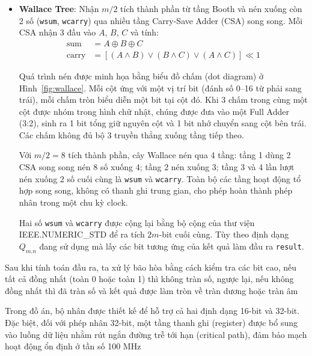 \documentclass{uetgraduation}
\begin{document}
\begin{itemize}
    \item  \textbf{Wallace Tree}: Nhận $m/2$ tích thành phần từ tầng
    Booth và nén xuống còn 2 số (\texttt{wsum}, \texttt{wcarry}) qua
    nhiều tầng Carry-Save Adder (CSA) song song. Mỗi CSA nhận 3 đầu
    vào $A$, $B$, $C$ và tính:
    \begin{equation}
    \begin{aligned}
        \text{sum}   &= A \oplus B \oplus C \\
        \text{carry} &= \left[(A \wedge B) \vee (B \wedge C)
                        \vee (A \wedge C)\right] \ll 1
    \end{aligned}
    \end{equation}

    Quá trình nén được minh họa bằng biểu đồ chấm (dot diagram) ở
    Hình~\ref{fig:wallace}. Mỗi cột ứng với một vị trí bit (đánh số
    0--16 từ phải sang trái), mỗi chấm tròn biểu diễn một bit tại cột
    đó. Khi 3 chấm trong cùng một cột được nhóm trong hình chữ nhật,
    chúng được đưa vào một Full Adder (3:2), sinh ra 1 bit tổng giữ
    nguyên cột và 1 bit nhớ chuyển sang cột bên trái. Các chấm không
    đủ bộ 3 truyền thẳng xuống tầng tiếp theo.

    Với $m/2 = 8$ tích thành phần, cây Wallace nén qua 4 tầng: tầng 1
    dùng 2 CSA song song nén 8 số xuống 4; tầng 2 nén xuống 3; tầng 3
    và 4 lần lượt nén xuống 2 số cuối cùng là \texttt{wsum} và
    \texttt{wcarry}. Toàn bộ các tầng hoạt động tổ hợp song song,
    không có thanh ghi trung gian, cho phép hoàn thành phép nhân trong
    một chu kỳ clock.

    Hai số \texttt{wsum} và \texttt{wcarry} được cộng lại bằng bộ cộng
    của thư viện IEEE.NUMERIC\_STD để ra tích $2m$-bit cuối cùng. Tùy
    theo định dạng $Q_{m.n}$ đang sử dụng mà lấy các bit tương ứng
    của kết quả làm đầu ra \texttt{result}.
\end{itemize}

Sau khi tính toán đầu ra, ta xử lý bão hòa bằng cách kiểm tra các bit cao, nếu tất cả đồng nhất (toàn 0 hoặc toàn 1) thì không tràn
số, ngược lại, nếu không đồng nhất thì đã tràn số và kết quả được làm tròn về tràn dương hoặc tràn âm

Trong đồ án, bộ nhân được thiết kế để hỗ trợ cả hai định dạng 16-bit và 32-bit. Đặc biệt, đối với phép nhân 32-bit, một tầng thanh ghi (register) được bổ sung vào luồng dữ liệu nhằm rút ngắn đường trễ tới hạn (critical path), đảm bảo mạch hoạt động ổn định ở tần số 100 MHz
\end{document}
